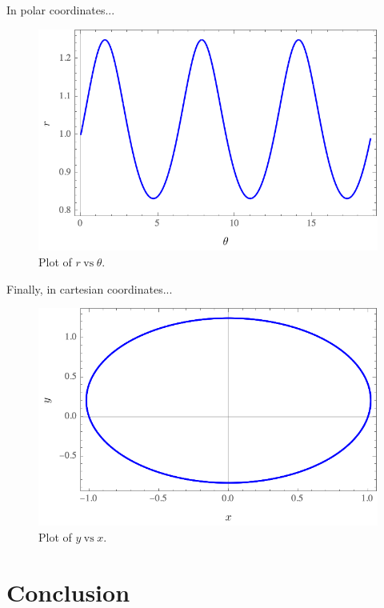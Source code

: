 \documentclass[hyperref={pdfpagelabels=false}]{beamer}
\begin{document}
\begin{frame}{In polar coordinates...}

\begin{figure}
\includegraphics[width=0.8\linewidth]{Figures/rvstheta.png}
\caption{Plot of $r \hspace{3pt} \text{vs} \hspace{3pt}  \theta$.}
\end{figure}
    
\end{frame}

\begin{frame}{Finally, in cartesian coordinates...}

\begin{figure}
\includegraphics[width=0.8\linewidth]{Figures/trayectoria.png}
\caption{Plot of $y \hspace{3pt} \text{vs} \hspace{3pt}  x$.}
\end{figure}
    
\end{frame}

\section{Conclusion}
\end{document}

